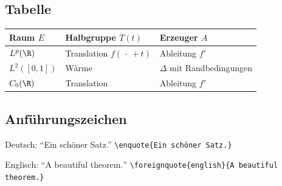 \begin{refsection}
\subsection*{Tabelle}

\begin{center}
\begin{tabular}{lll}
    \toprule
    Raum $E$ & Halbgruppe $T(t)$ & Erzeuger $A$ \\
    \midrule
    $L^{p}(\R)$ & Translation $f(\,\cdot\,+t)$ & Ableitung $f'$ \\
    $L^{2}([0,1])$ & Wärme & $\Delta$ mit Randbedingungen \\
    $C_{0}(\R)$ & Translation & Ableitung $f'$ \\
    \bottomrule
\end{tabular}
\end{center}

\subsection*{Anführungszeichen}

Deutsch: \enquote{Ein schöner Satz.} \verb|\enquote{Ein schöner Satz.}|

Englisch: \foreignquote{english}{A beautiful theorem.} \verb|\foreignquote{english}{A beautiful theorem.}|

\RaggedRight
\printbibliography
\end{refsection}
